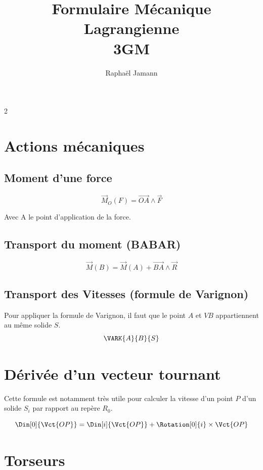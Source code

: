 \documentclass[10pt,a4paper]{article}
\author{Raphaël Jamann}
\title{Formulaire Mécanique Lagrangienne \\ 3GM}
\date{}
\renewcommand{\vec}{\overrightarrow}
\begin{document}
    \maketitle

    \begin{multicols}{2}

    \section{Actions mécaniques}

    \subsection*{Moment d'une force}

    \[
    \vec M_O(F) = \vec{OA} \wedge \vec F
    \]

    Avec A le point d'application de la force.

    \subsection*{Transport du moment (BABAR)}

    \[
    \vec M(B) = \vec M(A) + \vec{BA} \wedge \vec R
    \]


    \subsection*{Transport des Vitesses (formule de Varignon)}
        Pour appliquer la formule de Varignon, il faut que le point $A$ et $VB$ appartiennent au même solide $S$.
        $$ \VARK{A}{B}{S} $$



    \section{Dérivée d'un vecteur tournant}

    Cette formule est notamment très utile pour calculer la vitesse d'un point $P$ d'un solide $S_i$ par rapport au repère $R_0$.

    $$ \Din[0]{\Vct{OP}}=\Din[i]{\Vct{OP}}+\Rotation[0]{i}\times\Vct{OP} $$

    \section{Torseurs}


\end{multicols}
\end{document}
